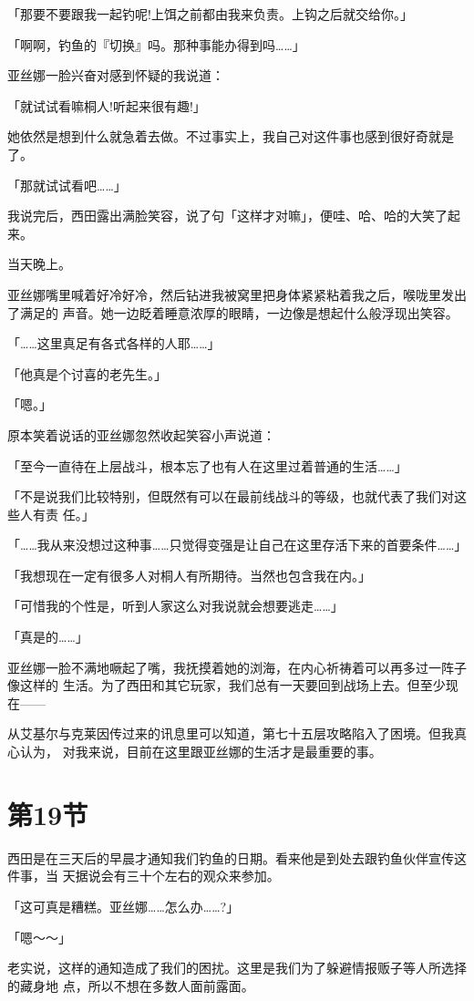 \documentclass[11pt]{book}
\begin{document}
「那要不要跟我一起钓呢!上饵之前都由我来负责。上钩之后就交给你。」

「啊啊，钓鱼的『切换』吗。那种事能办得到吗……」

亚丝娜一脸兴奋对感到怀疑的我说道：

「就试试看嘛桐人!听起来很有趣!」

她依然是想到什么就急着去做。不过事实上，我自己对这件事也感到很好奇就是了。

「那就试试看吧……」

我说完后，西田露出满脸笑容，说了句「这样才对嘛」，便哇、哈、哈的大笑了起来。

当天晚上。

亚丝娜嘴里喊着好冷好冷，然后钻进我被窝里把身体紧紧粘着我之后，喉咙里发出了满足的
声音。她一边眨着睡意浓厚的眼睛，一边像是想起什么般浮现出笑容。

「……这里真足有各式各样的人耶……」

「他真是个讨喜的老先生。」

「嗯。」

原本笑着说话的亚丝娜忽然收起笑容小声说道：

「至今一直待在上层战斗，根本忘了也有人在这里过着普通的生活……」

「不是说我们比较特别，但既然有可以在最前线战斗的等级，也就代表了我们对这些人有责
任。」

「……我从来没想过这种事……只觉得变强是让自己在这里存活下来的首要条件……」

「我想现在一定有很多人对桐人有所期待。当然也包含我在内。」

「可惜我的个性是，听到人家这么对我说就会想要逃走……」

「真是的……」

亚丝娜一脸不满地噘起了嘴，我抚摸着她的浏海，在内心祈祷着可以再多过一阵子像这样的
生活。为了西田和其它玩家，我们总有一天要回到战场上去。但至少现在——

从艾基尔与克莱因传过来的讯息里可以知道，第七十五层攻略陷入了困境。但我真心认为，
对我来说，目前在这里跟亚丝娜的生活才是最重要的事。
\section{第19节}
\label{sec:org4153204}
西田是在三天后的早晨才通知我们钓鱼的日期。看来他是到处去跟钓鱼伙伴宣传这件事，当
天据说会有三十个左右的观众来参加。

「这可真是糟糕。亚丝娜……怎么办……?」

「嗯～～」

老实说，这样的通知造成了我们的困扰。这里是我们为了躲避情报贩子等人所选择的藏身地
点，所以不想在多数人面前露面。
\end{document}
